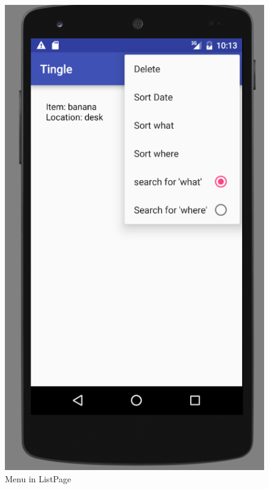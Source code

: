 \documentclass{article}
\begin{document}
\begin{figure}[h!]
	\centering
	\includegraphics[scale=0.7]{"ListPageMenu"}
	\caption{Menu in ListPage}
	\label{fig:ListPageMenu}
\end{figure}
\end{document}
